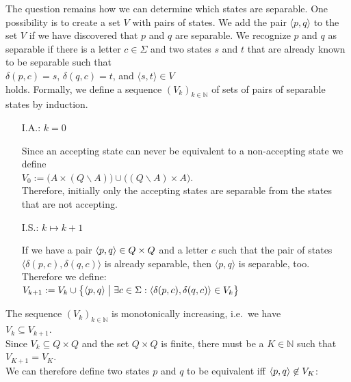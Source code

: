 The question remains how we can determine which states are separable.
One possibility is to create a set $V$ with pairs of states.  We add the pair $\langle p, q \rangle$ to the set
$V$ if we have discovered that $p$ and $q$ are separable.  We recognize $p$ and $q$ as separable if
there is a letter $c\in\Sigma$ and two states $s$ and $t$ that are already known to be separable such that 
\\[0.2cm]
\hspace*{1.3cm}
$\delta(p,c) = s$, \quad $\delta(q,c) = t$, \quad and \quad $\langle s, t \rangle \in V$
\\[0.2cm]
holds.  Formally, we define a sequence $(V_k)_{k\in\mathbb{N}}$ of sets of pairs of separable states by
induction.
\begin{enumerate}
\item[I.A.:] $k=0$

     Since an accepting state can never be equivalent to a non-accepting state we define
     \\[0.2cm]
     \hspace*{1.3cm}
     $V_0 := \bigl(A \times (Q \backslash A)\bigr) \cup \bigl((Q \backslash A) \times A\bigr)$.
     \\[0.2cm]
     Therefore, initially only the accepting states are separable from the states that are not accepting.
\item[I.S.:] $k \mapsto k + 1$

     If we have a pair $\pair(p,q) \in Q \times Q$ and a letter $c$ such that 
     the pair of states  $\langle \delta(p,c), \delta(q,c) \rangle$ is already separable, then $\langle p, q \rangle$ is
     separable, too.  Therefore we define:  
     \\[0.2cm]
     \hspace*{1.3cm}
     $V_{k+1} := V_k \cup \bigl\{ \pair(p,q) \bigm| \exists c \in \Sigma: \langle \delta(p,c), \delta(q,c) \rangle \in V_k \bigr\}$
\end{enumerate}
The sequence $(V_k)_{k\in\mathbb{N}}$ is monotonically increasing, i.e.~we have
\\[0.2cm]
\hspace*{1.3cm}
$V_{k} \subseteq V_{k+1}$.
\\[0.2cm]
Since $V_k \subseteq Q \times Q$ and the set $Q \times Q$ is finite, there must be a $K \in \mathbb{N}$ such that
\\[0.2cm]
\hspace*{1.3cm}
$V_{K+1} = V_K$.
\\[0.2cm]
We can therefore define two states $p$ and $q$ to be equivalent iff $\pair(p,q) \not\in V_K$:
